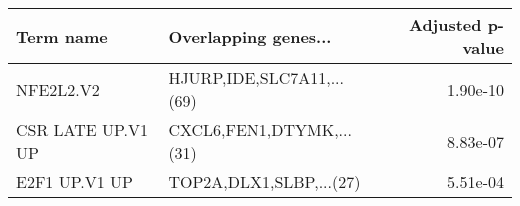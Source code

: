 \begin{tabular}{llr}
\toprule
        Term name &      Overlapping genes... &  Adjusted p-value \\
\midrule
        NFE2L2.V2 & HJURP,IDE,SLC7A11,...(69) &          1.90e-10 \\
CSR LATE UP.V1 UP &  CXCL6,FEN1,DTYMK,...(31) &          8.83e-07 \\
    E2F1 UP.V1 UP &   TOP2A,DLX1,SLBP,...(27) &          5.51e-04 \\
\bottomrule
\end{tabular}
